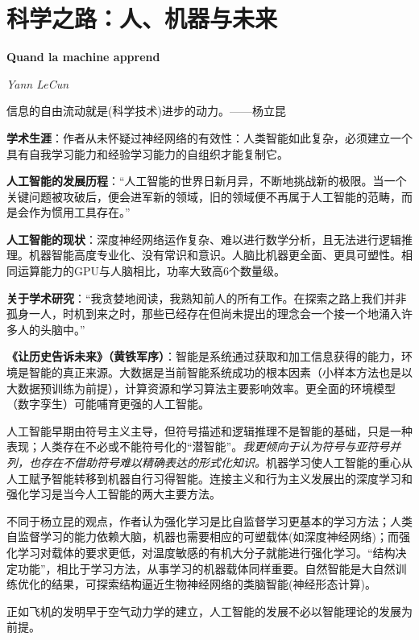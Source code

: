 \chapter{科学之路：人、机器与未来}
\Large\textbf{Quand la machine apprend}
\par \emph{Yann LeCun} \normalsize

\par 信息的自由流动就是(科学技术)进步的动力。——杨立昆

\par \textbf{学术生涯}：作者从未怀疑过神经网络的有效性：人类智能如此复杂，必须建立一个具有自我学习能力和经验学习能力的自组织才能复制它。

\par \textbf{人工智能的发展历程}：“人工智能的世界日新月异，不断地挑战新的极限。当一个关键问题被攻破后，便会进军新的领域，旧的领域便不再属于人工智能的范畴，而是会作为惯用工具存在。”

\par \textbf{人工智能的现状}：深度神经网络运作复杂、难以进行数学分析，且无法进行逻辑推理。机器智能高度专业化、没有常识和意识。人脑比机器更全面、更具可塑性。相同运算能力的GPU与人脑相比，功率大致高6个数量级。

\par \textbf{关于学术研究}：“我贪婪地阅读，我熟知前人的所有工作。在探索之路上我们并非孤身一人，时机到来之时，那些已经存在但尚未提出的理念会一个接一个地涌入许多人的头脑中。”

\par \textbf{《让历史告诉未来》（黄铁军序）}：智能是系统通过获取和加工信息获得的能力，环境是智能的真正来源。大数据是当前智能系统成功的根本因素（小样本方法也是以大数据预训练为前提），计算资源和学习算法主要影响效率。更全面的环境模型（数字孪生）可能哺育更强的人工智能。
\par 人工智能早期由符号主义主导，但符号描述和逻辑推理不是智能的基础，只是一种表现；人类存在不必或不能符号化的“潜智能”。\emph{我更倾向于认为符号与亚符号并列，也存在不借助符号难以精确表达的形式化知识。}机器学习使人工智能的重心从人工赋予智能转移到机器自行习得智能。连接主义和行为主义发展出的深度学习和强化学习是当今人工智能的两大主要方法。
\par 不同于杨立昆的观点，作者认为强化学习是比自监督学习更基本的学习方法；人类自监督学习的能力依赖大脑，机器也需要相应的可塑载体(如深度神经网络)；而强化学习对载体的要求更低，对温度敏感的有机大分子就能进行强化学习。“结构决定功能”，相比于学习方法，从事学习的机器载体同样重要。自然智能是大自然训练优化的结果，可探索结构逼近生物神经网络的类脑智能(神经形态计算)。
\par 正如飞机的发明早于空气动力学的建立，人工智能的发展不必以智能理论的发展为前提。